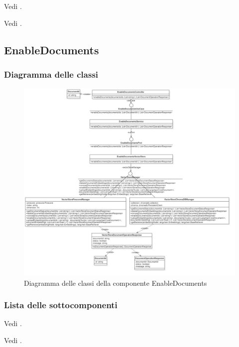 \documentclass[10pt, a4paper]{article}
\begin{document}
Vedi .

Vedi .






\subsection{EnableDocuments}
\subsubsection{Diagramma delle classi}
\begin{figure}[H]
    \centering        
    \includegraphics[width=16.5cm]{img/EnableDocs.png}
    \caption{Diagramma delle classi della componente EnableDocuments}
\end{figure}

\subsubsection{Lista delle sottocomponenti}




Vedi .


Vedi .
\end{document}
